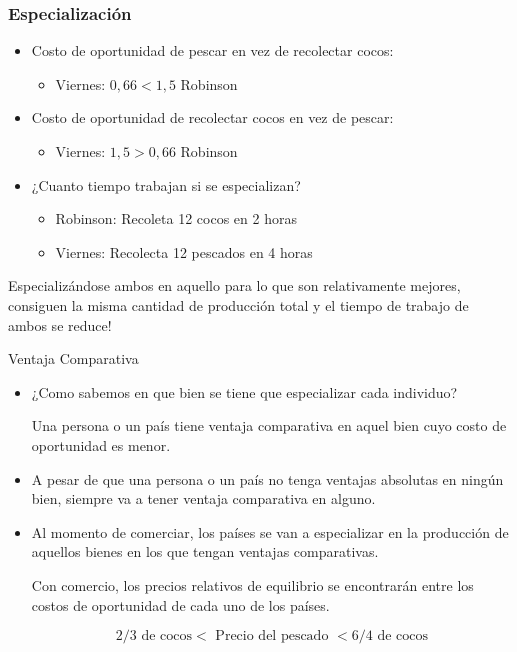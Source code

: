 \documentclass{beamer}
\begin{document}
\begin{frame}
\frametitle{Especialización}
    \begin{itemize}
        \item Costo de oportunidad de pescar en vez de recolectar cocos:
            \begin{itemize}
            \item Viernes: $ 0,66 < 1,5 $ Robinson 
            \end{itemize}
        \item Costo de oportunidad de recolectar cocos en vez de pescar:
            \begin{itemize}
            \item Viernes: $ 1,5 > 0,66 $ Robinson 
            \end{itemize}
        \item ¿Cuanto tiempo trabajan si se especializan?
            \begin{itemize}
            \item Robinson: Recoleta 12 cocos en 2 horas
            \item Viernes: Recolecta 12 pescados en 4 horas
            \end{itemize}
    \end{itemize}
    \begin{boxA}
        \centering
        Especializándose ambos en aquello para lo que
        son relativamente mejores, consiguen la misma cantidad de producción
        total y el tiempo de trabajo de ambos se reduce!
    \end{boxA}
\end{frame}

\begin{frame}{Ventaja Comparativa}
    \begin{itemize}
        \item ¿Como sabemos en que bien se tiene que especializar cada individuo?
        \begin{boxA}
            \centering
            Una persona o un país tiene ventaja comparativa en aquel bien
            cuyo costo de oportunidad es menor.
        \end{boxA}
        \item A pesar de que una persona o un país no tenga ventajas absolutas en ningún bien,
        siempre va a tener ventaja comparativa en alguno. 
        \item Al momento de comerciar, los países se van a especializar en la
        producción de aquellos bienes en los que tengan ventajas
        comparativas.
        \begin{boxA}
            \centering
            Con comercio, los precios relativos de equilibrio se encontrarán
            entre los costos de oportunidad de cada uno de los países.
        \end{boxA}
        \vspace{-4mm}
        \begin{equation*}
            2/3\text{ de cocos} < \text{ Precio del pescado } < 6/4\text{ de cocos}
        \end{equation*}
    \end{itemize}

\end{frame}
\end{document}
